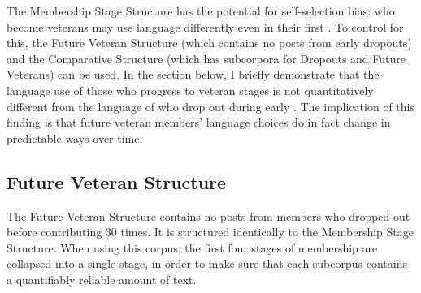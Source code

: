 The Membership Stage Structure has the potential for self-selection bias:  who become veterans may use language differently even in their first . To control for this, the Future Veteran Structure (which contains no \glspl{post} from early dropouts) and the Comparative Structure (which has subcorpora for Dropouts and Future Veterans) can be used. In the section below, I briefly demonstrate that the language use of those  who progress to veteran stages is not quantitatively different from the language of  who drop out during early . The implication of this finding is that future veteran members' language choices do in fact change in predictable ways over time.


\subsection{Future Veteran Structure}

The Future Veteran Structure contains no \glspl{post} from \glspl{member} who dropped out before contributing 30 times. It is structured identically to the Membership Stage Structure. When using this \gls{corpus}, the first four stages of membership are collapsed into a single stage, in order to make sure that each subcorpus contains a quantifiably reliable amount of text.

